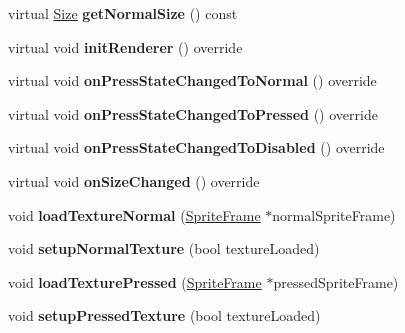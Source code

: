 \begin{DoxyCompactItemize}
\item 
\mbox{\label{classui_1_1Button_a411bcac6a96e33aeaa538c8f0d451f8c}} 
virtual \hyperlink{classSize}{Size} {\bfseries get\+Normal\+Size} () const
\item 
\mbox{\label{classui_1_1Button_a134f8d87a7ba98c0f1db9dd22042ba1a}} 
virtual void {\bfseries init\+Renderer} () override
\item 
\mbox{\label{classui_1_1Button_a1b973b8dd5e9c48a965012c69e8b76f1}} 
virtual void {\bfseries on\+Press\+State\+Changed\+To\+Normal} () override
\item 
\mbox{\label{classui_1_1Button_a3a5a2de9dd8f48cef6887a9d9ef9c5df}} 
virtual void {\bfseries on\+Press\+State\+Changed\+To\+Pressed} () override
\item 
\mbox{\label{classui_1_1Button_a9d1c6769872e14a5627c253c1f2084ce}} 
virtual void {\bfseries on\+Press\+State\+Changed\+To\+Disabled} () override
\item 
\mbox{\label{classui_1_1Button_a4cc0d72c1157a9cb1d63ec2d17b39954}} 
virtual void {\bfseries on\+Size\+Changed} () override
\item 
\mbox{\label{classui_1_1Button_a482bac73505a0dbbc56b2a779d859b2b}} 
void {\bfseries load\+Texture\+Normal} (\hyperlink{classSpriteFrame}{Sprite\+Frame} $\ast$normal\+Sprite\+Frame)
\item 
\mbox{\label{classui_1_1Button_a0e3cdb9b47c7d70c68f822a36a6badf5}} 
void {\bfseries setup\+Normal\+Texture} (bool texture\+Loaded)
\item 
\mbox{\label{classui_1_1Button_a815ef9c2b1b1d2ec01a04c7674a3c5df}} 
void {\bfseries load\+Texture\+Pressed} (\hyperlink{classSpriteFrame}{Sprite\+Frame} $\ast$pressed\+Sprite\+Frame)
\item 
\mbox{\label{classui_1_1Button_a8b2a1e1cdffbab171097ea89d8621fcd}} 
void {\bfseries setup\+Pressed\+Texture} (bool texture\+Loaded)
\item 

\end{DoxyCompactItemize}
